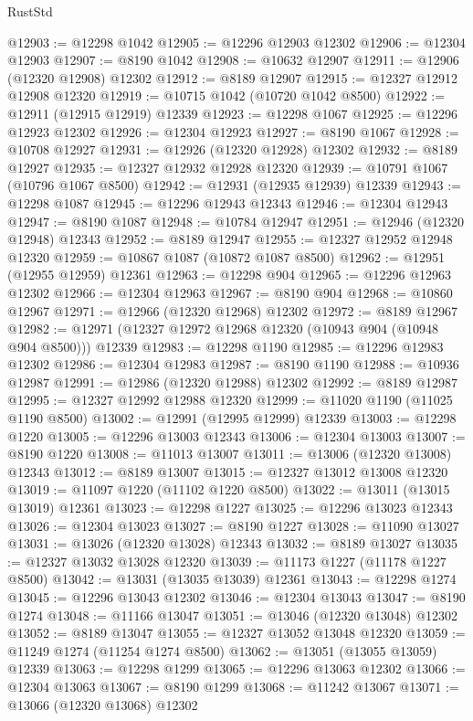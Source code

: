 \begin{lexlean}{RustStd}
\begin{coremodule}
@12903 := @12298 @1042
@12905 := @12296 @12903 @12302
@12906 := @12304 @12903
@12907 := @8190 @1042
@12908 := @10632 @12907
@12911 := @12906 (@12320 @12908) @12302
@12912 := @8189 @12907
@12915 := @12327 @12912 @12908 @12320
@12919 := @10715 @1042 (@10720 @1042 @8500)
@12922 := @12911 (@12915 @12919) @12339
@12923 := @12298 @1067
@12925 := @12296 @12923 @12302
@12926 := @12304 @12923
@12927 := @8190 @1067
@12928 := @10708 @12927
@12931 := @12926 (@12320 @12928) @12302
@12932 := @8189 @12927
@12935 := @12327 @12932 @12928 @12320
@12939 := @10791 @1067 (@10796 @1067 @8500)
@12942 := @12931 (@12935 @12939) @12339
@12943 := @12298 @1087
@12945 := @12296 @12943 @12343
@12946 := @12304 @12943
@12947 := @8190 @1087
@12948 := @10784 @12947
@12951 := @12946 (@12320 @12948) @12343
@12952 := @8189 @12947
@12955 := @12327 @12952 @12948 @12320
@12959 := @10867 @1087 (@10872 @1087 @8500)
@12962 := @12951 (@12955 @12959) @12361
@12963 := @12298 @904
@12965 := @12296 @12963 @12302
@12966 := @12304 @12963
@12967 := @8190 @904
@12968 := @10860 @12967
@12971 := @12966 (@12320 @12968) @12302
@12972 := @8189 @12967
@12982 := @12971 (@12327 @12972 @12968 @12320 (@10943 @904 (@10948 @904 @8500))) @12339
@12983 := @12298 @1190
@12985 := @12296 @12983 @12302
@12986 := @12304 @12983
@12987 := @8190 @1190
@12988 := @10936 @12987
@12991 := @12986 (@12320 @12988) @12302
@12992 := @8189 @12987
@12995 := @12327 @12992 @12988 @12320
@12999 := @11020 @1190 (@11025 @1190 @8500)
@13002 := @12991 (@12995 @12999) @12339
@13003 := @12298 @1220
@13005 := @12296 @13003 @12343
@13006 := @12304 @13003
@13007 := @8190 @1220
@13008 := @11013 @13007
@13011 := @13006 (@12320 @13008) @12343
@13012 := @8189 @13007
@13015 := @12327 @13012 @13008 @12320
@13019 := @11097 @1220 (@11102 @1220 @8500)
@13022 := @13011 (@13015 @13019) @12361
@13023 := @12298 @1227
@13025 := @12296 @13023 @12343
@13026 := @12304 @13023
@13027 := @8190 @1227
@13028 := @11090 @13027
@13031 := @13026 (@12320 @13028) @12343
@13032 := @8189 @13027
@13035 := @12327 @13032 @13028 @12320
@13039 := @11173 @1227 (@11178 @1227 @8500)
@13042 := @13031 (@13035 @13039) @12361
@13043 := @12298 @1274
@13045 := @12296 @13043 @12302
@13046 := @12304 @13043
@13047 := @8190 @1274
@13048 := @11166 @13047
@13051 := @13046 (@12320 @13048) @12302
@13052 := @8189 @13047
@13055 := @12327 @13052 @13048 @12320
@13059 := @11249 @1274 (@11254 @1274 @8500)
@13062 := @13051 (@13055 @13059) @12339
@13063 := @12298 @1299
@13065 := @12296 @13063 @12302
@13066 := @12304 @13063
@13067 := @8190 @1299
@13068 := @11242 @13067
@13071 := @13066 (@12320 @13068) @12302

\end{coremodule}
\end{lexlean}
